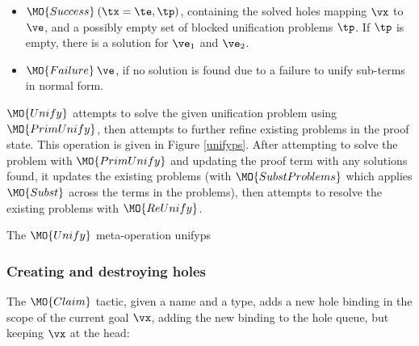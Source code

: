 \begin{itemize}
\item $\MO{Success}\:(\tx=\te, \tp)$, containing the solved holes mapping
$\vx$ to $\ve$, and a possibly empty set of blocked unification problems $\tp$.
If $\tp$ is empty, there is a solution for $\ve_1$ and $\ve_2$. 
\item $\MO{Failure}\:\ve$, if no solution is found due to a failure to unify
sub-terms in normal form.
\end{itemize}

$\MO{Unify}$ attempts to solve the given unification problem using
$\MO{PrimUnify}$,
then attempts to further refine existing problems in the proof
state. This operation is given in Figure \ref{unifyps}. After attempting to
solve the problem with $\MO{PrimUnify}$ and updating the proof term with
any solutions found, it updates the existing problems (with $\MO{SubstProblems}$
which applies $\MO{Subst}$ across the terms in the problems), then attempts to
resolve the existing problems with $\MO{ReUnify}$.

{The $\MO{Unify}$ meta-operation}
{unifyps}


\subsubsection{Creating and destroying holes}

The $\MO{Claim}$ tactic, given a name and a type, adds a new hole binding in
the scope of the current goal $\vx$, adding the new binding to the hole queue, but
keeping $\vx$ at the head:


